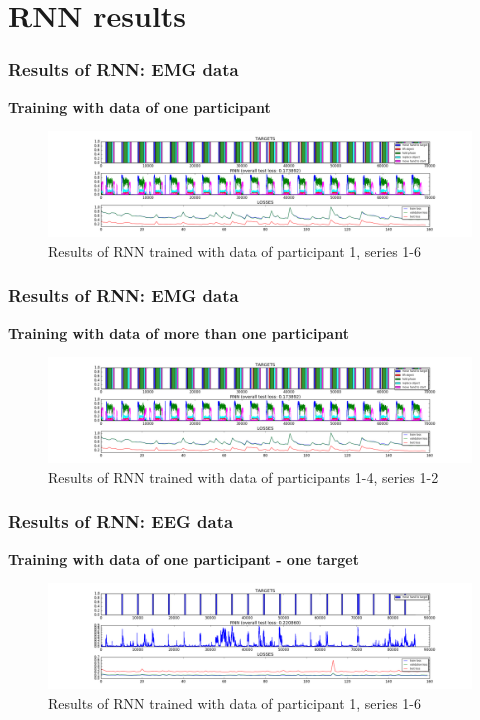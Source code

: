 \documentclass{beamer}
\begin{document}
\section{RNN results}		

\begin{frame}
	\frametitle{Results of RNN: EMG data}
	\textbf{Training with data of one participant}
	\begin{figure}[ht]
		\centering
		\includegraphics[width=1.0\textwidth,trim={5cm 0cm 5cm 0cm},clip]{images/EMG-results_participant_1_series1-6.png}
		\caption{Results of RNN trained with data of participant 1, series 1-6}
	\end{figure}
\end{frame}

\begin{frame}
	\frametitle{Results of RNN: EMG data}
	\textbf{Training with data of more than one participant}
	\begin{figure}[ht]
		\centering
		\includegraphics[width=1.0\textwidth,trim={5cm 0cm 5cm 0cm},clip]{images/EMG-results_participant_1-4_series1-2.png}
		\caption{Results of RNN trained with data of participants 1-4, series 1-2}

	\end{figure}
\end{frame}

\begin{frame}
	\frametitle{Results of RNN: EEG data}
	\textbf{Training with data of one participant - one target}
	\begin{figure}[ht]
		\centering
		\includegraphics[width=1.0\textwidth,trim={5cm 0cm 5cm 0cm},clip]{images/200_50_[1]_[1,2,3,4,5,6]_0_150_1_1469550907_eeg_test.png}
		\caption{Results of RNN trained with data of participant 1, series 1-6}

	\end{figure}
\end{frame}
\end{document}
